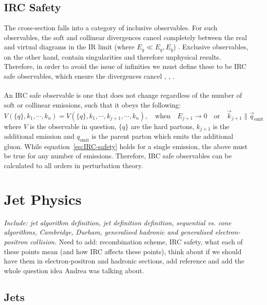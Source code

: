 \subsection{IRC Safety} 
\label{sec: IRC}
The cross-section falls into a category of inclusive observables. For such observables, the soft and collinear divergences cancel completely between the real and virtual diagrams in the IR limit (where $E_g\ll E_q,E_{\bar{q}}$) \cite{Campbell:2017hsr}. Exclusive observables, on the other hand, contain singularities and therefore unphysical results. Therefore, in order to avoid the issue of infinities we must define these to be IRC safe observables, which ensure the divergences cancel \cite{Luisoni:2015xha}, \cite{McAslan:2017bqp}, \cite{Arpino:2020smn}. \\ \\
An IRC safe observable is one that does not change regardless of the number of soft or collinear emissions, such that it obeys the following:
\begin{equation}
V(\{q\},k_1,\cdots ,k_n)=V(\{q\},k_1,\cdots , k_{j+1},\cdots ,k_n),\quad \text{when}\quad E_{j+1}\rightarrow0\quad\text{or}\quad\vec{k}_{j+1}\parallel \vec{q}_{\text{emit}}
	\label{eq:IRC-safety}
\end{equation}
where $V$ is the observable in question, $\{q\}$ are the hard partons, $k_{j+1}$ is the additional emission and ${q}_{\text{emit}}$ is the parent parton which emits the additional gluon. While equation~\eqref{eq:IRC-safety} holds for a single emission, the above must be true for any number of emissions. Therefore, IRC safe observables can be calculated to all orders in perturbation theory.




\section{Jet Physics}
\emph{Include: jet algorithm definition, jet definition definition, sequential vs. cone algorithms, Cambridge, Durham, generalised hadronic and generalised electron-positron collision.} {\color{green} Need to add: recombination scheme, IRC safety, what each of these points mean (and how IRC affects these points), think about if we should have them in electron-positron and hadronic sections, add reference and add the whole question idea Andrea was talking about.}
\subsection{Jets}

